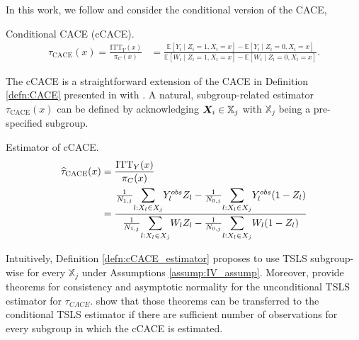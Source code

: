 In this work, we follow \cite{bargagli-stoffi_heterogeneous_2022} and consider the conditional version of the CACE, 

\begin{defn}{Conditional CACE (cCACE).}
   \begin{align*}
      \tau_{\text{CACE}}(x) = \frac{\text{ITT}_{Y}(x)}{\pi_C(x)} &= \frac{\mathbb{E}[Y_i \mid Z_i = 1, X_i = x] - \mathbb{E}[Y_i \mid Z_i = 0, X_i = x]}{\mathbb{E}[W_i \mid Z_i = 1, X_i = x] - \mathbb{E}[W_i \mid Z_i = 0, X_i = x]}.
   \end{align*}
\end{defn}

The cCACE is a straightforward extension of the CACE in Definition \ref{defn:CACE} presented in with \cite{bargagli-stoffi_heterogeneous_2022}. A natural, subgroup-related estimator $\tau_{\text{CACE}}(x)$ can be defined by acknowledging $\bm X_i \in \mathbb{X}_j$ with $\mathbb{X}_j$ being a pre-specified subgroup.

\begin{defn}{Estimator of cCACE.}
   \label{defn:cCACE_estimator}
   \begin{align*}
      \widehat\tau_{\text{CACE}}(x) &= \frac{\text{ITT}_{Y}(x)}{\pi_C(x)} \\
      &= \frac{\frac{1}{N_{1,j}} \mathlarger{\sum}_{l: X_l \in X_j} Y^{obs}_l Z_l - \frac{1}{N_{0,j}} \mathlarger{\sum}_{l: X_l \in X_j} Y^{obs}_l (1 - Z_l)}{\frac{1}{N_{1,j}} \mathlarger{\sum}_{l: X_l \in X_j} W_l Z_l - \frac{1}{N_{0,j}} \mathlarger{\sum}_{l: X_l \in X_j} W_l (1 - Z_l)
      }\\
   \end{align*}
\end{defn}

Intuitively, Definition \ref{defn:cCACE_estimator} proposes to use TSLS subgroup-wise for every $\mathbb{X}_j$ under Assumptions \ref{assump:IV_assump}. Moreover, \cite{Wooldridge2015} provide theorems for consistency and asymptotic normality for the unconditional TSLS estimator for $\tau_{CACE}$. \cite{bargagli-stoffi_heterogeneous_2022} show that those theorems can be transferred to the conditional TSLS estimator if there are sufficient number of observations for every subgroup in which the cCACE is estimated. 


